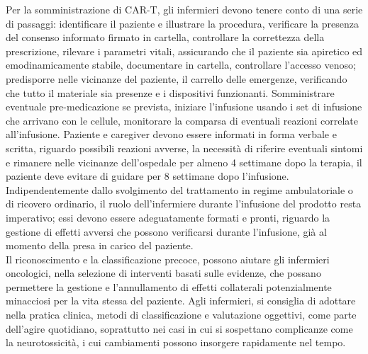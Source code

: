 Per la somministrazione di CAR-T, gli infermieri devono tenere conto di una serie di passaggi: identificare il paziente e 
illustrare la procedura, verificare la presenza del consenso informato firmato in cartella, controllare la correttezza 
della prescrizione, rilevare i parametri vitali, assicurando che il paziente sia apiretico ed emodinamicamente stabile, 
documentare in cartella, controllare l’accesso venoso; predisporre nelle vicinanze del paziente, il carrello delle 
emergenze, verificando che tutto il materiale sia presenze e i dispositivi funzionanti. Somministrare eventuale 
pre-medicazione se prevista, iniziare l’infusione usando i set di infusione che arrivano con le cellule, monitorare 
la comparsa di eventuali reazioni correlate all’infusione. Paziente e caregiver devono essere informati in forma 
verbale e scritta, riguardo possibili reazioni avverse, la necessità di riferire eventuali sintomi e rimanere 
nelle vicinanze dell’ospedale per almeno 4 settimane dopo la terapia, 
il paziente deve evitare di guidare per 8 settimane dopo l’infusione\cite{NURSINGCART}.\\

Indipendentemente dallo svolgimento del trattamento in regime ambulatoriale o di ricovero ordinario, 
il ruolo dell’infermiere durante l’infusione del prodotto resta imperativo; essi devono essere adeguatamente 
formati e pronti, riguardo la gestione di  effetti avversi che possono verificarsi durante l’infusione, 
già al momento della presa in carico del paziente\cite{article2}.\\
Il riconoscimento e la classificazione precoce, possono aiutare gli infermieri oncologici, nella selezione di interventi 
basati sulle evidenze, che possano permettere la gestione e l’annullamento di effetti collaterali potenzialmente 
minacciosi per la vita stessa del paziente. Agli infermieri, si consiglia di adottare nella pratica clinica, 
metodi di classificazione e valutazione oggettivi, come parte dell’agire quotidiano, soprattutto nei 
casi in cui si sospettano complicanze come la neurotossicità, i cui cambiamenti possono insorgere 
rapidamente nel tempo\cite{article4}.\\


